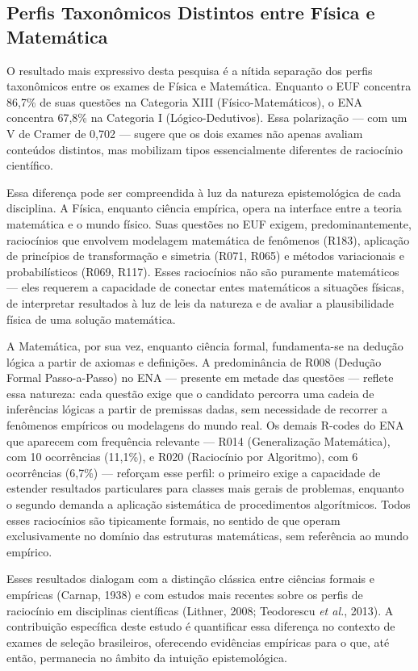 \documentclass[
  12pt,
  a4paper,
  twoside,
  brazilian
]{article}
\begin{document}
\subsection{Perfis Taxonômicos Distintos entre Física e
Matemática}\label{perfis-taxonuxf4micos-distintos-entre-fuxedsica-e-matemuxe1tica}

O resultado mais expressivo desta pesquisa é a nítida separação dos
perfis taxonômicos entre os exames de Física e Matemática. Enquanto o
EUF concentra 86,7\% de suas questões na Categoria XIII
(Físico-Matemáticos), o ENA concentra 67,8\% na Categoria I
(Lógico-Dedutivos). Essa polarização --- com um V de Cramer de 0,702 ---
sugere que os dois exames não apenas avaliam conteúdos distintos, mas
mobilizam tipos essencialmente diferentes de raciocínio científico.

Essa diferença pode ser compreendida à luz da natureza epistemológica de
cada disciplina. A Física, enquanto ciência empírica, opera na interface
entre a teoria matemática e o mundo físico. Suas questões no EUF exigem,
predominantemente, raciocínios que envolvem modelagem matemática de
fenômenos (R183), aplicação de princípios de transformação e simetria
(R071, R065) e métodos variacionais e probabilísticos (R069, R117).
Esses raciocínios não são puramente matemáticos --- eles requerem a
capacidade de conectar entes matemáticos a situações físicas, de
interpretar resultados à luz de leis da natureza e de avaliar a
plausibilidade física de uma solução matemática.

A Matemática, por sua vez, enquanto ciência formal, fundamenta-se na
dedução lógica a partir de axiomas e definições. A predominância de R008
(Dedução Formal Passo-a-Passo) no ENA --- presente em metade das
questões --- reflete essa natureza: cada questão exige que o candidato
percorra uma cadeia de inferências lógicas a partir de premissas dadas,
sem necessidade de recorrer a fenômenos empíricos ou modelagens do mundo
real. Os demais R-codes do ENA que aparecem com frequência relevante ---
R014 (Generalização Matemática), com 10 ocorrências (11,1\%), e R020
(Raciocínio por Algoritmo), com 6 ocorrências (6,7\%) --- reforçam esse
perfil: o primeiro exige a capacidade de estender resultados
particulares para classes mais gerais de problemas, enquanto o segundo
demanda a aplicação sistemática de procedimentos algorítmicos. Todos
esses raciocínios são tipicamente formais, no sentido de que operam
exclusivamente no domínio das estruturas matemáticas, sem referência ao
mundo empírico.

Esses resultados dialogam com a distinção clássica entre ciências
formais e empíricas (Carnap, 1938) e com estudos mais recentes sobre os
perfis de raciocínio em disciplinas científicas (Lithner, 2008;
Teodorescu \textit{et al.}, 2013). A contribuição específica deste estudo é
quantificar essa diferença no contexto de exames de seleção brasileiros,
oferecendo evidências empíricas para o que, até então, permanecia no
âmbito da intuição epistemológica.
\end{document}
